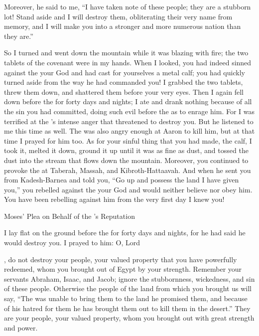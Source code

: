 {Moreover, he said
to
me, “I have taken note
of these
people;
they are a stubborn lot!
Stand
aside
and I will destroy
them, obliterating
their very name
from
memory,
and I will make
you into
a stronger
and more numerous
nation
than they are.”
\par }{\PP {}So I turned
and went down
the mountain
while it
was blazing
with fire;
the two
tablets
of the covenant
were in my hands.
When I looked,
you had indeed
sinned
against the
{}
your God
and had cast for yourselves a metal
calf;
you had quickly
turned aside
from
the way
he had
commanded you!
I grabbed
the two
tablets,
threw
them down, and shattered
them before your very eyes.
Then I again fell
down before
the {}
for forty
days
and nights;
I ate
and drank
nothing
because
of all
the sin
you had
committed,
doing
such evil
before
the {}
as to enrage him.
For
I was terrified
at the
{}’s
intense
anger
that
threatened
to destroy
you. But he
listened
to me
this time
as well.
The
{}
was also angry
enough
at Aaron
to kill
him, but at
that time
I prayed
for him too.
As for your sinful
thing
that you had
made,
the calf,
I took
it,
melted it down,
ground
it up
until
it was as fine as dust,
and tossed
the dust
into
the
stream
that flows
down
the mountain.
Moreover, you continued to provoke the
{}
at Taberah,
Massah,
and Kibroth-Hattaavah.
And when he
sent
you from Kadesh-Barnea
and told
you, “Go up
and possess
the land
I have
given
you,” you rebelled
against the
{}
your God
and would neither
believe
nor
obey him.
You have been rebelling
against him
from the very first day
I knew you!
\par }{\SH Moses’ Plea on Behalf of the
{}’s Reputation
\par }{\PP {}I lay flat on
the ground
before
the {}
for forty
days
and nights,
for
he had
said
he would destroy you.
I prayed
to him: O, Lord

{}, do not
destroy
your people,
your valued
property that
you have powerfully
redeemed,
whom
you brought out
of Egypt
by
your strength.
Remember
your servants
Abraham,
Isaac,
and Jacob;
ignore the stubbornness,
wickedness,
and sin
of these
people.
Otherwise
the people of the land
from which
you brought
us will say,
“The
{}
was unable
to bring
them to
the land
he promised
them, and because of his hatred
for them he has brought them out
to kill
them in the desert.”
They
are your people,
your valued
property, whom
you brought out
with great
strength
and power.

}
